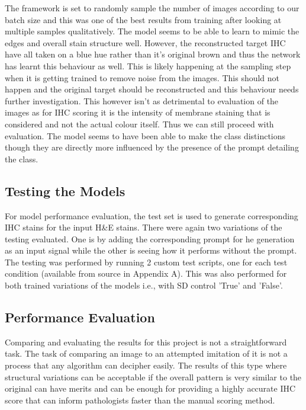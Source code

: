 The framework is set to randomly sample the number of images according to our batch size and this was one of the best results from training after looking at multiple samples qualitatively. The model seems to be able to learn to mimic the edges and overall stain structure well. However, the reconstructed target IHC have all taken on a blue hue rather than it's original brown and thus the network has learnt this behaviour as well. This is likely happening at the sampling step when it is getting trained to remove noise from the images. This should not happen and the original target should be reconstructed and this behaviour needs further investigation. This however isn't as detrimental to evaluation of the images as for IHC scoring it is the intensity of membrane staining that is considered and not the actual colour itself. Thus we can still proceed with evaluation. The model seems to have been able to make the class distinctions though they are directly more influenced by the presence of the prompt detailing the class.

\subsection{Testing the Models}

For model performance evaluation, the test set is used to generate corresponding IHC stains for the input H\&E stains. There were again two variations of the testing evaluated. One is by adding the corresponding prompt for he generation as an input signal while the other is seeing how it performs without the prompt. The testing was performed by running 2 custom test scripts, one for each test condition (available from source in Appendix A). This was also performed for both trained variations of the models i.e., with SD control 'True' and 'False'.

\subsection{Performance Evaluation}

Comparing and evaluating the results for this project is not a straightforward task. The task of comparing an image to an attempted imitation of it is not a process that any algorithm can decipher easily. The results of this type where structural variations can be acceptable if the overall pattern is very similar to the original can have merits and can be enough for providing a highly accurate IHC score that can inform pathologists faster than the manual scoring method. 

